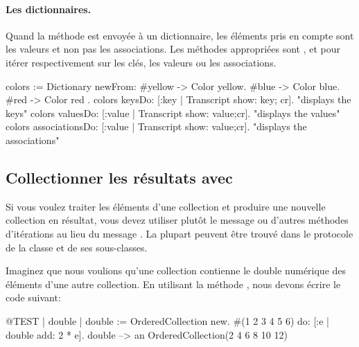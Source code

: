 \documentclass[a4paper,10pt,twoside]{book}
\begin{document}


\paragraph{Les dictionnaires.}
Quand la m\'ethode  est envoy\'ee \`a un dictionnaire,
les \'el\'ements pris en compte sont les valeurs et non pas les associations.
Les m\'ethodes appropri\'ees sont ,  et  pour it\'erer respectivement sur les cl\'es, les valeurs ou les associations.

\begin{code}{}
colors := Dictionary newFrom: { #yellow -> Color yellow. #blue -> Color blue. #red -> Color red }.
colors keysDo: [:key | Transcript show: key; cr].                    "displays the keys"
colors valuesDo: [:value | Transcript show: value;cr].            "displays the values"
colors associationsDo: [:value | Transcript show: value;cr].  "displays the associations"
\end{code}

\subsection{Collectionner les r\'esultats avec }
Si vous voulez traiter les \'el\'ements d'une collection et produire
une nouvelle collection en r\'esultat, vous devez utiliser plut\^ot le
message  ou d'autres m\'ethodes d'it\'erations au lieu
du message .
La plupart peuvent \^etre trouv\'e dans le protocole  
de la classe  et de ses sous-classes.

Imaginez que nous voulions qu'une collection contienne le double 
num\'erique des \'el\'ements d'une autre collection. 
En utilisant la m\'ethode , nous devons \'ecrire le code suivant:

\begin{code}{@TEST | double |}
double := OrderedCollection new.
#(1 2 3 4 5 6) do: [:e | double add: 2 * e].
double --> an OrderedCollection(2 4 6 8 10 12)
\end{code}
\end{document}
